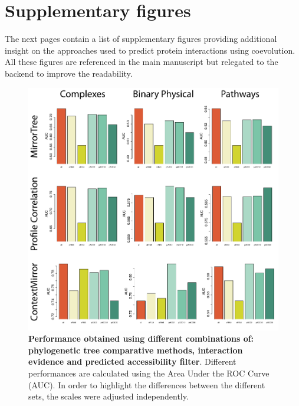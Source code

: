 \chapter{Supplementary figures}
\label{supplementaryfigures}

The next pages contain a list of supplementary figures providing additional insight on the approaches used to predict protein interactions using coevolution. All these figures are referenced in the main manuscript but relegated to the backend to improve the readability.


\begin{figure}[htbp]
\centering
\includegraphics[keepaspectratio,width=\textwidth,height=0.75\textheight]{../figures/accsROCs_differentScales.pdf}
\caption{\textbf{Performance obtained using different combinations of: phylogenetic tree comparative methods, interaction evidence and predicted accessibility filter}. Different performances are calculated using the Area Under the ROC Curve (AUC). In order to highlight the differences between the different sets, the scales were adjusted independently.}
\label{accsrocs_differentscales.pdf}
\end{figure}

